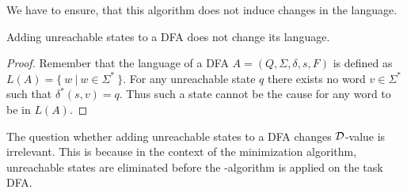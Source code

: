 \noindent We have to ensure, that this algorithm does not induce changes in the language.
\begin{lemma}
	Adding unreachable states to a DFA does not change its language.
\end{lemma}
\begin{proof}
	Remember that the language of a DFA $A = (Q, \Sigma, \delta, s, F)$ is defined as $L(A) = \{\ w\ |\ w \in \Sigma^* \ \}$. For any unreachable state $q$ there exists no word $v \in \Sigma^*$ such that $\delta^*(s,v) = q$. Thus such a state cannot be the cause for any word to be in $L(A)$.
\end{proof}

\noindent The question whether adding unreachable states to a DFA changes $\mathcal{D}$-value is irrelevant. This is because in the context of the minimization algorithm, unreachable states are eliminated before the \CompDist-algorithm is applied on the task DFA.

